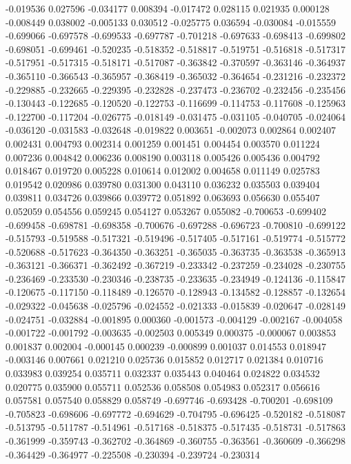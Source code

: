 -0.019536
0.027596
-0.034177
0.008394
-0.017472
0.028115
0.021935
0.000128
-0.008449
0.038002
-0.005133
0.030512
-0.025775
0.036594
-0.030084
-0.015559
-0.699066
-0.697578
-0.699533
-0.697787
-0.701218
-0.697633
-0.698413
-0.699802
-0.698051
-0.699461
-0.520235
-0.518352
-0.518817
-0.519751
-0.516818
-0.517317
-0.517951
-0.517315
-0.518171
-0.517087
-0.363842
-0.370597
-0.363146
-0.364937
-0.365110
-0.366543
-0.365957
-0.368419
-0.365032
-0.364654
-0.231216
-0.232372
-0.229885
-0.232665
-0.229395
-0.232828
-0.237473
-0.236702
-0.232456
-0.235456
-0.130443
-0.122685
-0.120520
-0.122753
-0.116699
-0.114753
-0.117608
-0.125963
-0.122700
-0.117204
-0.026775
-0.018149
-0.031475
-0.031105
-0.040705
-0.024064
-0.036120
-0.031583
-0.032648
-0.019822
0.003651
-0.002073
0.002864
0.002407
0.002431
0.004793
0.002314
0.001259
0.001451
0.004454
0.003570
0.011224
0.007236
0.004842
0.006236
0.008190
0.003118
0.005426
0.005436
0.004792
0.018467
0.019720
0.005228
0.010614
0.012002
0.004658
0.011149
0.025783
0.019542
0.020986
0.039780
0.031300
0.043110
0.036232
0.035503
0.039404
0.039811
0.034726
0.039866
0.039772
0.051892
0.063693
0.056630
0.055407
0.052059
0.054556
0.059245
0.054127
0.053267
0.055082
-0.700653
-0.699402
-0.699458
-0.698781
-0.698358
-0.700676
-0.697288
-0.696723
-0.700810
-0.699122
-0.515793
-0.519588
-0.517321
-0.519496
-0.517405
-0.517161
-0.519774
-0.515772
-0.520688
-0.517623
-0.364350
-0.363251
-0.365035
-0.363735
-0.363538
-0.365913
-0.363121
-0.366371
-0.362492
-0.367219
-0.233342
-0.237259
-0.234028
-0.230755
-0.236469
-0.233530
-0.230346
-0.238735
-0.233635
-0.234949
-0.124136
-0.115847
-0.120675
-0.117150
-0.118489
-0.126570
-0.128943
-0.134582
-0.128857
-0.132654
-0.029322
-0.045638
-0.025796
-0.024552
-0.021333
-0.015839
-0.020647
-0.028149
-0.024751
-0.032884
-0.001895
0.000360
-0.001573
-0.004129
-0.002167
-0.004058
-0.001722
-0.001792
-0.003635
-0.002503
0.005349
0.000375
-0.000067
0.003853
0.001837
0.002004
-0.000145
0.000239
-0.000899
0.001037
0.014553
0.018947
-0.003146
0.007661
0.021210
0.025736
0.015852
0.012717
0.021384
0.010716
0.033983
0.039254
0.035711
0.032337
0.035443
0.040464
0.024822
0.034532
0.020775
0.035900
0.055711
0.052536
0.058508
0.054983
0.052317
0.056616
0.057581
0.057540
0.058829
0.058749
-0.697746
-0.693428
-0.700201
-0.698109
-0.705823
-0.698606
-0.697772
-0.694629
-0.704795
-0.696425
-0.520182
-0.518087
-0.513795
-0.511787
-0.514961
-0.517168
-0.518375
-0.517435
-0.518731
-0.517863
-0.361999
-0.359743
-0.362702
-0.364869
-0.360755
-0.363561
-0.360609
-0.366298
-0.364429
-0.364977
-0.225508
-0.230394
-0.239724
-0.230314
